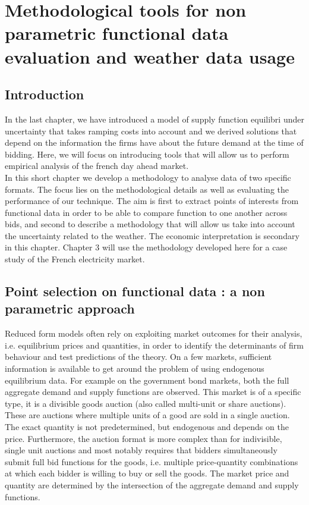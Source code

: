 

\renewcommand{\thesection}{\arabic{chapter}.\arabic{section}}


\chapter{Methodological tools for non parametric functional data evaluation and weather data usage} 
\label{chap:ch1-5}
\cleardoublepage

\doublespacing
\section{Introduction}
In the last chapter, we have introduced a model of supply function equilibri under uncertainty that takes ramping costs into account and we derived solutions that depend on the information the firms have about the future demand at the time of bidding. Here, we will focus on introducing tools that will allow us to perform empirical analysis of the french day ahead market.\\

In this short chapter we develop a methodology to analyse data of two specific formats. The focus lies on the methodological details as well as evaluating the performance of our technique. The aim is first to extract points of interests from functional data in order to be able to compare function to one another across bids, and second to describe a methodology that will allow us take into account the uncertainty related to the weather. The economic interpretation is secondary in this chapter. Chapter 3 will use the methodology developed here for a case study of the French electricity market.\\

\section{Point selection on functional data : a non parametric approach}
Reduced form models often rely on exploiting market outcomes for their analysis, i.e. equilibrium prices and quantities, in order to identify the determinants of firm behaviour and test predictions of the theory. On a few markets, sufficient information is available to get around the problem of using endogenous equilibrium data. For example on the government bond markets, both the full aggregate demand and supply functions are observed. This market is of a specific type, it is a divisible goods auction (also called multi-unit or share auctions). These are auctions where multiple units of a good are sold in a single auction. The exact quantity is not predetermined, but endogenous and depends on the price. Furthermore, the auction format is more complex than for indivisible, single unit auctions and most notably requires that bidders simultaneously submit full bid functions for the goods, i.e. multiple price-quantity combinations at which each bidder is willing to buy or sell the goods. The market price and quantity are determined by the intersection of the aggregate demand and supply functions.\\


